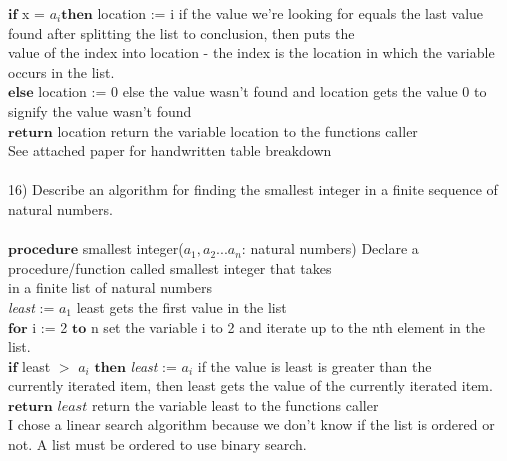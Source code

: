 \documentclass{article}
\begin{document}
\begin{flushleft}
\setlength\parindent{24pt}$\textbf{if}$ x = $a_i \textbf{then}$ location := i  {\tiny if the value we're looking for equals the last value found after splitting the list to conclusion, then puts the\\ value of the index into location - the index is the location in which the variable occurs in the list. }\\
\setlength\parindent{24pt}$\textbf{else}$ location := 0 {\tiny else the value wasn't found and location gets the value 0 to signify the value wasn't found} \\
\setlength\parindent{24pt}$\textbf{return}$ location {\tiny return the variable location to the functions caller} \\
{\tiny *See attached paper for handwritten table breakdown} \\
~\\
\setlength\parindent{0pt}16) Describe an algorithm for finding the smallest integer in a finite sequence of natural numbers. \\
~\\
\setlength\parindent{24pt}$\textbf{procedure}$ smallest integer($a_1, a_2 . . . a_n$: natural numbers) {\tiny Declare a procedure/function called smallest integer that takes \\in a finite list of natural numbers}\\
\setlength\parindent{24pt}\textit{least} := $a_1$ {\tiny least gets the first value in the list}\\
\setlength\parindent{24pt}$\textbf{for}$ i := 2 $\textbf{to}$ n {\tiny set the variable i to 2 and iterate up to the nth element in the list.}\\
\setlength\parindent{48pt} $\textbf{if}$ least $>$ $a_i$ $\textbf{then}$ \textit{least} := $a_i$ {\tiny if the value is least is greater than the \\currently iterated item, then least gets the value of the currently iterated item.}\\ 
\setlength\parindent{24pt} $\textbf{return}$ $\textit{least}$ {\tiny return the variable least to the functions caller} \\
{\tiny *I chose a linear search algorithm because we don't know if the list is ordered or not.  A list must be ordered to use binary search.}


\end{flushleft}
\end{document}
